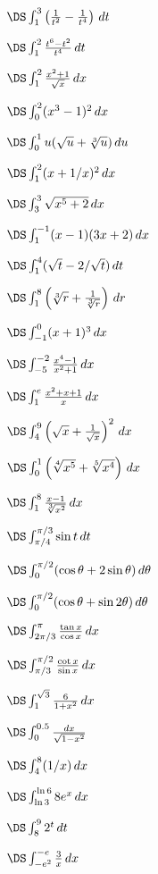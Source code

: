 \begin{multicols}{2}
\problem $\DS \int^3_1 \left(\frac{1}{ t^2}-\frac{1}{ t^4}\right) \,dt$

\problem $\DS \int^2_1 \frac{t^6-t^2}{ t^4} \,dt$

\problem $\DS \int^2_1 \frac{x^2+1}{ \sqrt{x}} \,dx$

\problem $\DS \int^2_0 (x^3-1)^2 \,dx$

\problem $\DS \int^1_0 u(\sqrt{u}+{\root 3 \of u}) \,du$

\problem $\DS \int^2_{1} (x+1/x)^2 \,dx$

\problem $\DS \int^3_{3} \sqrt{x^5+2} \,dx$

\problem $\DS \int^{-1}_1 (x-1)(3x+2) \,dx$

\problem $\DS \int^{4}_1 (\sqrt{t}-2/\sqrt{t}) \,dt$

\problem $\DS \int^{8}_1 \left({\root 3\of r}+\frac{1}{ {\root 3 \of r}}\right)
\,dr$

\problem $\DS \int^{0}_{-1} (x+1)^3 \,dx$

\problem $\DS \int^{-2}_{-5} \frac{x^4-1}{ x^2+1} \,dx$

\problem $\DS \int^e_{1} \frac{x^2+x+1}{ x} \,dx$

\problem $\DS \int^9_{4} \left(\sqrt{x}+\frac{1}{ \sqrt{x}}\right)^2 \,dx$

\problem $\DS \int^1_{0} \left({\root 4\of {x^5}}+{\root 5\of {x^4}}\right)
\,dx$

\problem $\DS \int^8_{1} \frac{x-1}{ {\root 3\of {x^2}}} \,dx$

\problem $\DS \int^{\pi/3}_{\pi/4} \sin t \,dt$

\problem $\DS \int^{\pi/2}_0 (\cos \theta + 2\sin \theta) \,d\theta$

\problem $\DS \int^{\pi/2}_0 (\cos \theta + \sin 2\theta) \,d\theta$

\problem $\DS \int^{\pi}_{2\pi/3} \frac{\tan x}{\cos x} \,dx$

\problem $\DS \int^{\pi/2}_{\pi/3} \frac{\cot x}{\sin x} \,dx$

\problem $\DS \int^{\sqrt{3}}_{1} \frac{6}{ {1+x^2}} \,dx$

\problem $\DS \int^{0.5}_{0} \frac{dx}{ \sqrt{1-x^2}}$

\problem $\DS \int^{8}_{4} (1/x) \,dx$

\problem $\DS \int^{\ln 6}_{\ln 3} 8e^x \,dx$

\problem $\DS \int^{9}_{8} 2^t \,dt$

\problem $\DS \int^{-e}_{-e^2} \frac{3}{ x} \,dx$


\end{multicols}
